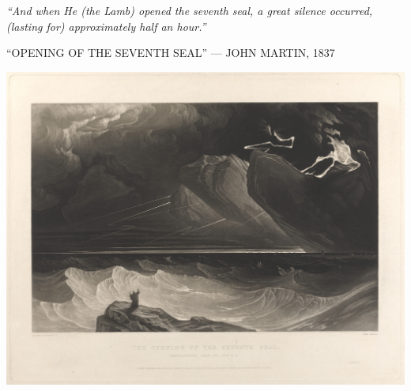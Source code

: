 \clearpage
\thispagestyle{empty}
\null\vfill
\settowidth{}
\begin{center}
\parbox{\longest}{%
  \raggedright{\huge\itshape%
    ``And when He (the Lamb) opened the seventh seal, a great silence occurred, (lasting for) approximately half an hour.'' \par\bigskip
  }
  \raggedleft\Large\MakeUppercase{``Opening of the Seventh Seal'' — John Martin, 1837}\par%
}
\vfill\vfill
\clearpage\newpage
\end{center}
\newpage
\thispagestyle{empty}
\begin{center}
	\includegraphics[angle=90, width=1\textwidth]{images/illustrations/johnmartinseventhseal.jpg}
\end{center}